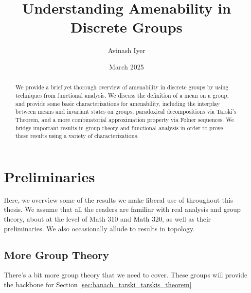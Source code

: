 \documentclass[10pt]{mypackage2}
\title{Understanding Amenability in Discrete Groups}
\author{Avinash Iyer}
\date{March 2025}
\begin{document}
\maketitle
\RaggedRight
\begin{abstract}
  We provide a brief yet thorough overview of amenability in discrete groups by using techniques from functional analysis. We discuss the definition of a mean on a group, and provide some basic characterizations for amenability, including the interplay between means and invariant states on groups, paradoxical decompositions via Tarski's Theorem, and a more combinatorial approximation property via Følner sequences. We bridge important results in group theory and functional analysis in order to prove these results using a variety of characterizations.
\end{abstract}
\section{Preliminaries}\label{sec:preliminaries}%
Here, we overview some of the results we make liberal use of throughout this thesis. We assume that all the readers are familiar with real analysis and group theory, about at the level of Math 310 and Math 320, as well as their preliminaries. We also occasionally allude to results in topology.
\subsection{More Group Theory}%
There's a bit more group theory that we need to cover. These groups will provide the backbone for Section \ref{sec:banach_tarski_tarskis_theorem}\newline
\end{document}
